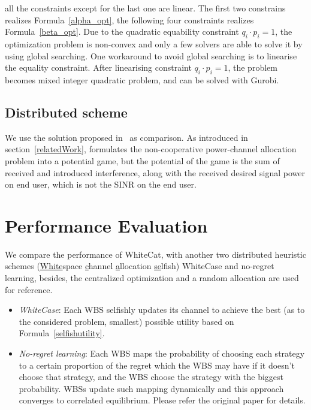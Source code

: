 		all the constraints except for the last one are linear.
The first two constrains realizes Formula~\ref{alpha_opt}, the following four constraints realizes Formula~\ref{beta_opt}.
Due to the quadratic equability constraint $q_i\cdot p_i =1$, the optimization problem is non-convex and only a few solvers are able to solve it by using global searching.
One workaround to avoid global searching is to linearise the equality constraint. 
After linearising constraint $q_i\cdot p_i =1$, the problem becomes mixed integer quadratic problem, and can be solved with Gurobi.

\subsection{Distributed scheme}
We use the solution proposed in~\cite{pimrc_2012} as comparison.
As introduced in section~\ref{relatedWork}, \cite{pimrc_2012} formulates the non-cooperative power-channel allocation problem into a potential game, but the potential of the game is the sum of received and introduced interference, along with the received desired signal power on end user, which is not the SINR on the end user.



\section{Performance Evaluation}
\label{simulation}
We compare the performance of WhiteCat, with another two distributed heuristic schemes (\underline{White}space \underline{c}hannel \underline{a}llocation \underline{se}lfish) WhiteCase and no-regret learning, besides, the centralized optimization and a random allocation are used for reference.

\begin{itemize}
\item \textit{WhiteCase}:  Each WBS selfishly updates its channel to achieve the best (as to the considered problem, smallest) possible utility based on Formula~\ref{selfishutility}.

\item \textit{No-regret learning}: Each WBS maps the probability of choosing each strategy to a certain proportion of the regret which the WBS may have if it doesn't choose that strategy, and the WBS choose the strategy with the biggest probability.  
WBSs update such mapping dynamically and this approach converges to correlated equilibrium. 
Please refer the original paper \cite{hart00correlatedeq} for details.
		
\end{itemize}



